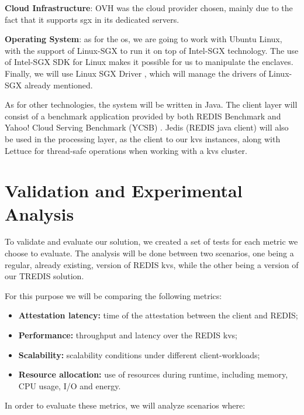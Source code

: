 \textbf{Cloud Infrastructure}: OVH \cite{ovhCloud} was the cloud provider chosen, mainly due to the fact that it supports \gls{sgx} in its dedicated servers.

\textbf{Operating System}: as for the \gls{os}, we are going to work with Ubuntu Linux, with the support of Linux-SGX \cite{linuxSGXwebsite} to run it on top of Intel-SGX technology. The use of Intel-SGX SDK \cite{linuxSgxSDK} for Linux makes it possible for us to manipulate the enclaves. Finally, we will use Linux SGX Driver \cite{linuxSGXDrivers}, which will manage the drivers of Linux-SGX already mentioned.

As for other technologies, the system will be written in Java. 
The client layer will consist of a benchmark application provided by both REDIS Benchmark and Yahoo! Cloud Serving Benchmark (YCSB) \cite{ycsb}. 
Jedis (REDIS java client) \cite{jedis} will also be used in the processing layer, as the client to our \gls{kvs} instances, along with Lettuce \cite{lettuce} for thread-safe operations when working with a \gls{kvs} cluster.


\section{Validation and Experimental Analysis} %
\label{sec:floats_figures_and_captions}

To validate and evaluate our solution, we created a set of tests for each metric we choose to evaluate. The analysis will be done between two scenarios, one being a regular, already existing, version of REDIS \gls{kvs}, while the other being a version of our TREDIS solution.

For this purpose we will be comparing the following metrics:

\begin{itemize}
	\item \textbf{Attestation latency:} time of the attestation between the client and REDIS;
	\item \textbf{Performance:} throughput and latency over the REDIS \gls{kvs};
	\item \textbf{Scalability:} scalability conditions under different client-workloads;
	\item \textbf{Resource allocation:} use of resources during runtime, including memory, CPU usage, I/O and energy.
\end{itemize}

In order to evaluate these metrics, we will analyze scenarios where:

